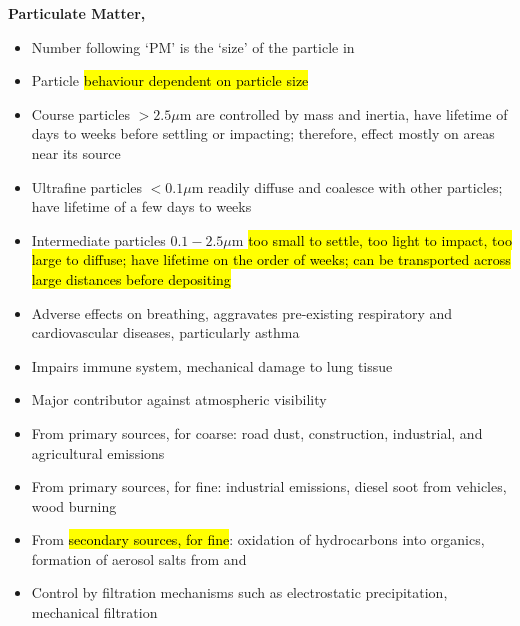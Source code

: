 \documentclass{article}
\newcommand{\headingsmall}[1]{{\small\textbf{#1}}}
\begin{document}
\begin{multicols*}{4}
\headingsmall{Particulate Matter, }
\begin{itemize} \itemsep -0.5em
    \item Number following `PM' is the `size' of the particle in 
    \item Particle \hl{behaviour dependent on particle size}
    \item Course particles $> 2.5 \mu \mathrm{m}$ are controlled by mass and
        inertia, have lifetime of days to weeks before settling or impacting; 
        therefore, effect mostly on areas near its source
    \item Ultrafine particles $< 0.1 \mu \mathrm{m}$ readily diffuse and coalesce
        with other particles; have lifetime of a few days to weeks
    \item Intermediate particles $0.1 - 2.5 \mu \mathrm{m}$ \hl{too small to settle,
        too light to impact, too large to diffuse; have lifetime on the order of
        weeks; can be transported across large distances before depositing}
    \item Adverse effects on breathing, aggravates pre-existing respiratory and
        cardiovascular diseases, particularly asthma
    \item Impairs immune system, mechanical damage to lung tissue
    \item Major contributor against atmospheric visibility
    \item From primary sources, for coarse: road dust, construction, industrial,
        and agricultural emissions
    \item From primary sources, for fine: industrial emissions, diesel soot from
        vehicles, wood burning
    \item From \hl{secondary sources, for fine}: oxidation of hydrocarbons into
        organics, formation of aerosol salts from  and 
    \item Control by filtration mechanisms such as electrostatic precipitation,
        mechanical filtration
\end{itemize}


\end{multicols*}
\end{document}
